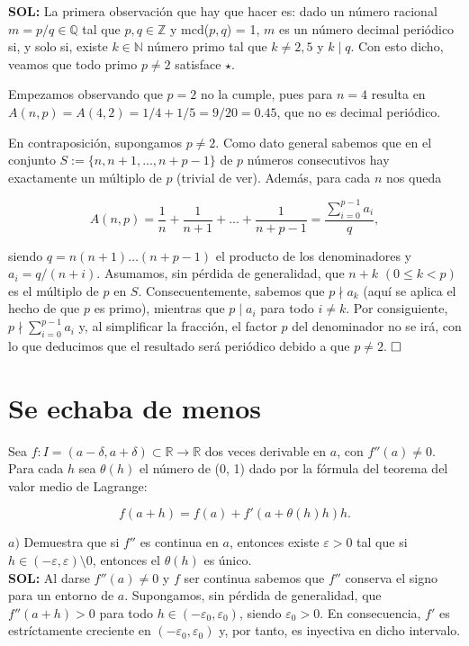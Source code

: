 \documentclass{article}
\begin{document}
\noindent\textbf{SOL:} La primera observación que hay que hacer es: dado un número racional $m = p / q \in \mathbb{Q}$ tal que $p, q \in \mathbb{Z}$ y mcd($p, q$) = 1, $m$ es un número decimal periódico si, y solo si, existe $k \in \mathbb{N}$ número primo tal que $k \neq 2, 5$ y $k \mid q$. Con esto dicho, veamos que todo primo $p \neq 2$ satisface $\star$. 

Empezamos observando que $p = 2$ no la cumple, pues para $n = 4$ resulta en $A(n, p) = A(4, 2) = 1/4 + 1/5 = 9/20 = 0.45$, que no es decimal periódico.

En contraposición, supongamos $p \neq 2$. Como dato general sabemos que en el conjunto $S := \{n, n + 1, ..., n + p - 1\}$ de $p$ números consecutivos hay exactamente un múltiplo de $p$ (trivial de ver). Además, para cada $n$ nos queda

\[A(n,p) = \frac{1}{n} + \frac{1}{n + 1} + ... + \frac{1}{n + p - 1} = \frac{\sum_{i=0}^{p - 1}a_i}{q},\]

\noindent siendo $q = n(n + 1)\dots(n + p - 1)$ el producto de los denominadores y $a_i = q/(n + i)$. Asumamos, sin pérdida de generalidad, que $n + k$ $(0 \leq k < p)$ es el múltiplo de $p$ en $S$. Consecuentemente, sabemos que $p \nmid a_k$ (aquí se aplica el hecho de que $p$ es primo), mientras que $p \mid a_i$ para todo $i \neq k$. Por consiguiente, $p \nmid \sum_{i=0}^{p - 1}a_i$ y, al simplificar la fracción, el factor $p$ del denominador no se irá, con lo que deducimos que el resultado será periódico debido a que $p \neq 2$. $\hfill\square$ 

\newpage

\section{Se echaba de menos}

Sea $f : I = (a - \delta, a + \delta) \subset \mathbb{R} \longrightarrow \mathbb{R}$ dos veces derivable en $a$, con $f''(a) \neq 0$. Para cada $h$ sea $\theta(h)$ el número de (0, 1) dado por la fórmula del teorema del valor medio de Lagrange:

\[f(a + h) = f(a) + f'(a + \theta(h)h)h.\]

$a)$ Demuestra que si $f''$ es continua en $a$, entonces existe $\varepsilon > 0$ tal que si $h \in (-\varepsilon, \varepsilon) \setminus {0}$, entonces el $\theta(h)$ es único. \\

\noindent\textbf{SOL:} Al darse $f''(a) \neq 0$ y $f$ ser continua sabemos que $f''$ conserva el signo para un entorno de $a$. Supongamos, sin pérdida de generalidad, que $f''(a + h) > 0$ para todo $h \in (-\varepsilon_0, \varepsilon_0)$, siendo $\varepsilon_0 > 0$. En consecuencia, $f'$ es estríctamente creciente en $(-\varepsilon_0, \varepsilon_0)$ y, por tanto, es inyectiva en dicho intervalo.
\end{document}
